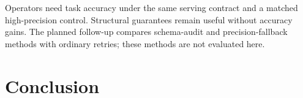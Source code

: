 \documentclass[10pt,twocolumn]{article}
\begin{document}
Operators need task accuracy under the same serving contract and a matched high-precision control. Structural guarantees remain useful without accuracy gains. The planned follow-up compares schema-audit and precision-fallback methods with ordinary retries; these methods are not evaluated here.

\section{Conclusion}


\FloatBarrier

{\small}
\end{document}
